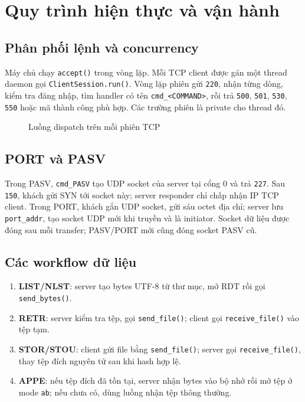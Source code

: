 \section{Quy trình hiện thực và vận hành}

\subsection{Phân phối lệnh và concurrency}
Máy chủ chạy \texttt{accept()} trong vòng lặp. \cite{sodhi2013enhanced} %
Mỗi TCP client được gán một thread daemon gọi \texttt{ClientSession.run()}. 
Vòng lặp phiên gửi \texttt{220}, nhận từng dòng, kiểm tra đăng nhập, tìm handler có tên \texttt{cmd\_<COMMAND>}, rồi trả \texttt{500}, \texttt{501}, \texttt{530}, \texttt{550} hoặc mã thành công phù hợp. 
Các trường phiên là private cho thread đó.

\begin{figure}[H]\centering
{}
\caption{Luồng dispatch trên mỗi phiên TCP}\end{figure}

\subsection{PORT và PASV}
Trong PASV, \texttt{cmd\_PASV} tạo UDP socket của server tại cổng 0 và trả \texttt{227}. 
Sau \texttt{150}, khách gửi SYN tới socket này; server responder chỉ chấp nhận IP TCP client. 
Trong PORT, khách gắn UDP socket, gửi sáu octet địa chỉ; server lưu \texttt{port\_addr}, tạo socket UDP mới khi truyền và là initiator. 
Socket dữ liệu được đóng sau mỗi transfer; PASV/PORT mới cũng đóng socket PASV cũ.

\subsection{Các workflow dữ liệu}
\begin{enumerate}
\item \textbf{LIST/NLST}: server tạo bytes UTF-8 từ thư mục, mở RDT rồi gọi \texttt{send\_bytes()}.
\item \textbf{RETR}: server kiểm tra tệp, gọi \texttt{send\_file()}; client gọi \texttt{receive\_file()} vào tệp tạm.
\item \textbf{STOR/STOU}: client gửi file bằng \texttt{send\_file()}; server gọi \texttt{receive\_file()}, thay tệp đích nguyên tử sau khi hash hợp lệ.
\item \textbf{APPE}: nếu tệp đích đã tồn tại, server nhận bytes vào bộ nhớ rồi mở tệp ở mode \texttt{ab}; nếu chưa có, dùng luồng nhận tệp thông thường.
\end{enumerate}

